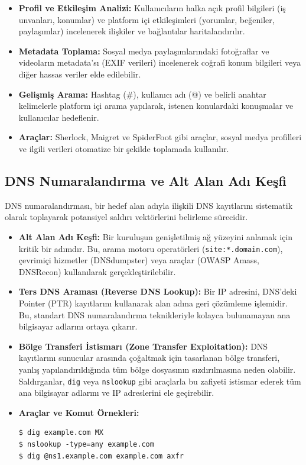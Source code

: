 \begin{itemize}
\item \textbf{Profil ve Etkileşim Analizi:} Kullanıcıların halka açık profil bilgileri (iş unvanları, konumlar) ve platform içi etkileşimleri (yorumlar, beğeniler, paylaşımlar) incelenerek ilişkiler ve bağlantılar haritalandırılır.
\item \textbf{Metadata Toplama:} Sosyal medya paylaşımlarındaki fotoğraflar ve videoların metadata'sı (EXIF verileri) incelenerek coğrafi konum bilgileri veya diğer hassas veriler elde edilebilir.
\item \textbf{Gelişmiş Arama:} Hashtag (\#), kullanıcı adı (@) ve belirli anahtar kelimelerle platform içi arama yapılarak, istenen konulardaki konuşmalar ve kullanıcılar hedeflenir.
\item \textbf{Araçlar:} Sherlock, Maigret ve SpiderFoot gibi araçlar, sosyal medya profilleri ve ilgili verileri otomatize bir şekilde toplamada kullanılır.
\end{itemize}

\subsection{DNS Numaralandırma ve Alt Alan Adı Keşfi}

DNS numaralandırması, bir hedef alan adıyla ilişkili DNS kayıtlarını sistematik olarak toplayarak potansiyel saldırı vektörlerini belirleme sürecidir.

\begin{itemize}
\item \textbf{Alt Alan Adı Keşfi:} Bir kuruluşun genişletilmiş ağ yüzeyini anlamak için kritik bir adımdır. Bu, arama motoru operatörleri (\texttt{site:*.domain.com}), çevrimiçi hizmetler (DNSdumpster) veya araçlar (OWASP Amass, DNSRecon) kullanılarak gerçekleştirilebilir.
\item \textbf{Ters DNS Araması (Reverse DNS Lookup):} Bir IP adresini, DNS'deki Pointer (PTR) kayıtlarını kullanarak alan adına geri çözümleme işlemidir. Bu, standart DNS numaralandırma teknikleriyle kolayca bulunamayan ana bilgisayar adlarını ortaya çıkarır.
\item \textbf{Bölge Transferi İstismarı (Zone Transfer Exploitation):} DNS kayıtlarını sunucular arasında çoğaltmak için tasarlanan bölge transferi, yanlış yapılandırıldığında tüm bölge dosyasının sızdırılmasına neden olabilir. Saldırganlar, \texttt{dig} veya \texttt{nslookup} gibi araçlarla bu zafiyeti istismar ederek tüm ana bilgisayar adlarını ve IP adreslerini ele geçirebilir.
\item \textbf{Araçlar ve Komut Örnekleri:}
\begin{verbatim}
$ dig example.com MX
$ nslookup -type=any example.com
$ dig @ns1.example.com example.com axfr
\end{verbatim}
\end{itemize}

